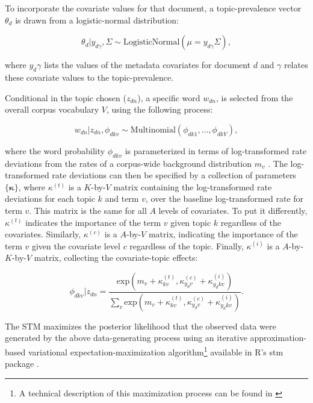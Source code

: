 \documentclass[12pt,a4paper,notitlepage]{article}
\begin{document}
To incorporate the covariate values for that document, a topic-prevalence vector $\theta_d$ is drawn from a logistic-normal distribution:

\begin{equation}
	\theta_d|y_{d\gamma},\Sigma \sim \textrm{LogisticNormal}(\mu = y_{d\gamma}\Sigma),
\end{equation}

where $y_d\gamma$ lists the values of the metadata covariates for document $d$ and $\gamma$ relates these covariate values to the topic-prevalence. 

Conditional in the topic chosen ($z_{dn}$), a specific word $w_{dn}$, is selected from the overall corpus vocabulary $V$, using the following process:

\begin{equation}
	w_{dn}|z_{dn},\phi_{dkv} \sim \textrm{Multinomial}(\phi_{dk1},...,\phi_{dkV}),
\end{equation}

where the word probability $\phi_{dkv}$ is parameterized in terms of log-transformed rate deviations from the rates of a corpus-wide background distribution $m_v$ \citep{roberts_structural_2013}. The log-transformed rate deviations can then be specified by a collection of parameters $\lbrace \boldsymbol{\kappa} \rbrace$, where $\kappa^{(t)}$ is a $K$-by-$V$ matrix containing the log-transformed rate deviations for each topic $k$ and term $v$, over the baseline log-transformed rate for term $v$. This matrix is the same for all $A$ levels of covariates. To put it differently, $\kappa^{(t)}$ indicates the importance of the term $v$ given topic $k$ regardless of the covariates. Similarly, $\kappa^{(c)}$ is a $A$-by-$V$ matrix, indicating the importance of the term $v$ given the covariate level $c$ regardless of the topic. Finally, $\kappa^{(i)}$ is a $A$-by-$K$-by-$V$ matrix, collecting the covariate-topic effects:

\begin{equation}
	\phi_{dkv}|z_{dn}=\frac{\textrm{exp}(m_v+\kappa^{(t)}_{kv},\kappa^{(c)}_{y_dv}+\kappa^{(i)}_{y_dkv})}{\sum_v \textrm{exp}(m_v+\kappa^{(t)}_{kv},\kappa^{(c)}_{y_dv}+\kappa^{(i)}_{y_dkv})}.
\end{equation}

The STM maximizes the posterior likelihood that the observed data were generated by the above data-generating process using an iterative approximation-based variational expectation-maximization algorithm\footnote{A technical description of this maximization process can be found in \citet{roberts_model_2016}} available in R's stm package \citep{roberts_stm:_2016}. 
\end{document}
